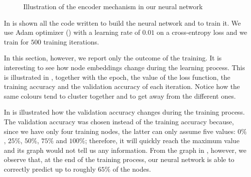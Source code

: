 \documentclass[12pt,a4paper]{report}
\theoremstyle{definition}
\begin{document}
\begin{figure}
    \caption{Illustration of the encoder mechanism in our neural network}
    \label{fig:encoder}
\end{figure}

In  is shown all the code written to build the neural network and to train it.
We use Adam optimizer (\cite{adam_opt}) with a learning rate of $0.01$ on a cross-entropy loss and we train for $500$ training iterations.

In this section, however, we report only the outcome of the training.
It is interesting to see how node embeddings change during the learning process.
This is illustrated in , together with the epoch, the value of the loss function, the training accuracy and the validation accuracy of each iteration.
Notice how the same colours tend to cluster together and to get away from the different ones.

In  is illustrated how the validation accuracy changes during the training process.
The validation accuracy was chosen instead of the training accuracy because, since we have only four training nodes, the latter can only assume five values: $0\%$, $25\%$, $50\%$, $75\%$ and $100\%$; therefore, it will quickly reach the maximum value and its graph would not tell us any information.
From the graph in , however, we observe that, at the end of the training process, our neural network is able to correctly predict up to roughly $65\%$ of the nodes.
\end{document}
